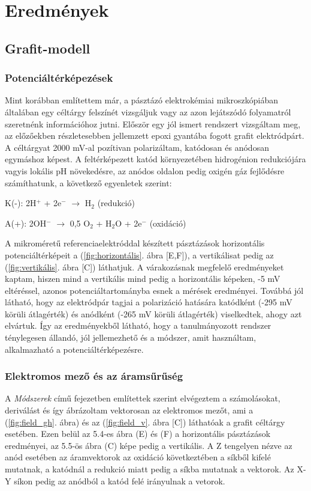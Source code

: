 \chapter{Eredmények}
\pagestyle{headings}

\section{Grafit-modell}
\subsection{Potenciáltérképezések}
Mint korábban említettem már, a pásztázó elektrokémiai mikroszkópiában általában egy céltárgy felszínét vizsgáljuk vagy az azon lejátszódó folyamatról szeretnénk információhoz jutni. Először egy jól ismert rendszert vizsgáltam meg, az előzőekben részletesebben jellemzett epoxi gyantába fogott grafit elektródpárt. A céltárgyat 2000 mV-al pozítivan polarizáltam, katódosan és anódosan egymáshoz képest. A feltérképezett katód környezetében hidrogénion redukciójára vagyis lokális pH növekedésre, az anódos oldalon pedig oxigén gáz fejlődésre számíthatunk, a következő egyenletek szerint:

K(-): 2H$^+$ + 2e$^-$ $\longrightarrow$ H$_2$ (redukció)

A(+):  2OH$^-$ $\longrightarrow$ 0,5 O$_2$ + H$_2$O + 2e$^-$ (oxidáció)

A mikroméretű referenciaelektróddal készített pásztázások horizontális potenciáltérképeit a (\ref{fig:horizontális}. ábra [E,F]), a vertikálisat pedig az (\ref{fig:vertikális}. ábra [C]) láthatjuk. A várakozásnak megfelelő eredményeket kaptam, hiszen mind a vertikális mind pedig a horizontális képeken, -5 mV eltéréssel, azonos potenciáltartományba esnek a mérések eredményei. Továbbá jól látható, hogy az elektródpár tagjai a polarizáció hatására katódként (-295 mV körüli átlagérték) és anódként (-265 mV körüli átlagérték) viselkedtek, ahogy azt elvártuk. Így az eredményekből látható, hogy a tanulmányozott rendszer ténylegesen állandó, jól jellemezhető és a módszer, amit használtam, alkalmazható a potenciáltérképezésre. 

\subsection{Elektromos mező és az áramsűrűség}
A \emph{Módszerek} című fejezetben említettek szerint elvégeztem a számolásokat, deriválást és így ábrázoltam vektorosan az elektromos mezőt, ami a (\ref{fig:field_gh}. ábra) és az (\ref{fig:field_v}. ábra [C]) láthatóak a grafit céltárgy esetében. Ezen belül az 5.4-es ábra (E) és (F) a horizontális pásztázások eredményei, az 5.5-ös ábra (C) képe pedig a vertikális. A Z tengelyen nézve az anód esetében az áramvektorok az oxidáció következtében a síkből kifelé mutatnak, a katódnál a redukció miatt pedig a síkba mutatnak a vektorok. Az X-Y síkon pedig az anódból a katód felé irányulnak a vetorok.  

